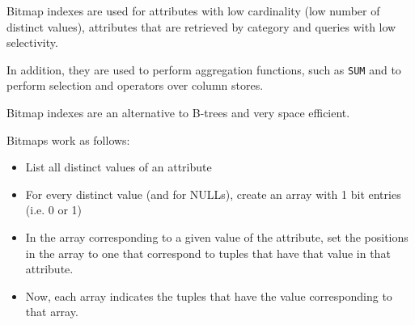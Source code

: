 Bitmap indexes are used for attributes with low cardinality (low number of distinct values), attributes that are retrieved by category and queries with low selectivity.

In addition, they are used to perform aggregation functions, such as \texttt{SUM} and to perform selection and operators over column stores.

Bitmap indexes are an alternative to B-trees and very space efficient.

Bitmaps work as follows:
\begin{itemize}
    \item List all distinct values of an attribute
    \item For every distinct value (and for NULLs), create an array with 1 bit entries (i.e. 0 or 1)
    \item In the array corresponding to a given value of the attribute, set the positions in the array to one that correspond to tuples that have that value in that attribute.
    \item Now, each array indicates the tuples that have the value corresponding to that array.
\end{itemize}

